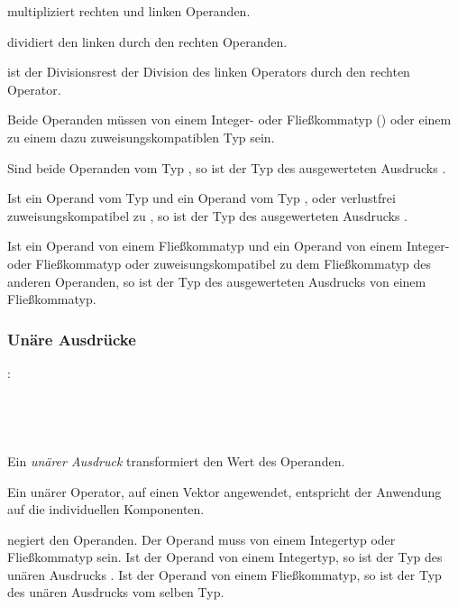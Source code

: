 \op{*} multipliziert rechten und linken Operanden.

\op{/} dividiert den linken durch den rechten Operanden.

\op{\%} ist der Divisionsrest der Division des linken Operators durch den rechten Operator.

Beide Operanden müssen von einem Integer- oder Fließkommatyp () oder einem
zu einem dazu zuweisungskompatiblen Typ sein.

Sind beide Operanden vom Typ , so ist der Typ des ausgewerteten Ausdrucks .

Ist ein Operand vom Typ  und ein Operand vom Typ ,  oder
verlustfrei zuweisungskompatibel zu , so ist der Typ des ausgewerteten Ausdrucks .

Ist ein Operand von einem Fließkommatyp und ein Operand von einem Integer- oder Fließkommatyp
oder zuweisungskompatibel zu dem Fließkommatyp des anderen Operanden,
so ist der Typ des ausgewerteten Ausdrucks von einem Fließkommatyp.


\subsubsection{Unäre Ausdrücke}\label{Unaere Ausdruecke}
:\label{asdr_unaer}\\
\hspace*{1cm}\glq\Gt{$\sim$}\grq  {} \\
\hspace*{1cm}\glq\Gt{-}\grq  {} \\
\hspace*{1cm}\glq\Gt{!}\grq  {} \\
\hspace*{1cm} \\

Ein \emph{unärer Ausdruck} transformiert den Wert des Operanden.

Ein unärer Operator, auf einen Vektor angewendet, entspricht der Anwendung auf die individuellen Komponenten.

\op{-} negiert den Operanden. Der Operand muss von einem Integertyp oder Fließkommatyp sein.
Ist der Operand von einem Integertyp, so ist der Typ des unären Ausdrucks .
Ist der Operand von einem Fließkommatyp, so ist der Typ des unären Ausdrucks vom selben Typ.

